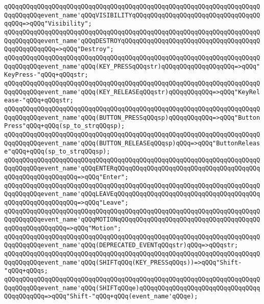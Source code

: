 \verb|qQQqqQQqqQQqqQQqqQQqqQQqqQQqqQQqqQQqqQQqqQQqqQQqqQQqqQQqqQQqqQQqqQQqqQQqqQQqqQQqevent_name'qQQqVISIBILITYqQQqqQQqqQQqqQQqqQQqqQQqqQQqqQQqqQQqqQQq=>qQQq"Visibility";|\newline
\verb|qQQqqQQqqQQqqQQqqQQqqQQqqQQqqQQqqQQqqQQqqQQqqQQqqQQqqQQqqQQqqQQqqQQqqQQqqQQqqQQqevent_name'qQQqDESTROYqQQqqQQqqQQqqQQqqQQqqQQqqQQqqQQqqQQqqQQqqQQqqQQqqQQq=>qQQq"Destroy";|\newline
\verb|qQQqqQQqqQQqqQQqqQQqqQQqqQQqqQQqqQQqqQQqqQQqqQQqqQQqqQQqqQQqqQQqqQQqqQQqqQQqqQQqevent_name'qQQq(KEY_PRESSqQQqstr)qQQqqQQqqQQqqQQqqQQq=>qQQq"KeyPress-"qQQq+qQQqstr;|\newline
\verb|qQQqqQQqqQQqqQQqqQQqqQQqqQQqqQQqqQQqqQQqqQQqqQQqqQQqqQQqqQQqqQQqqQQqqQQqqQQqqQQqevent_name'qQQq(KEY_RELEASEqQQqstr)qQQqqQQqqQQq=>qQQq"KeyRelease-"qQQq+qQQqstr;|\newline
\verb|qQQqqQQqqQQqqQQqqQQqqQQqqQQqqQQqqQQqqQQqqQQqqQQqqQQqqQQqqQQqqQQqqQQqqQQqqQQqqQQqevent_name'qQQq(BUTTON_PRESSqQQqsp)qQQqqQQqqQQq=>qQQq"ButtonPress"qQQq+qQQq(sp_to_strqQQqsp);|\newline
\verb|qQQqqQQqqQQqqQQqqQQqqQQqqQQqqQQqqQQqqQQqqQQqqQQqqQQqqQQqqQQqqQQqqQQqqQQqqQQqqQQqevent_name'qQQq(BUTTON_RELEASEqQQqsp)qQQq=>qQQq"ButtonRelease"qQQq+qQQq(sp_to_strqQQqsp);|\newline
\verb|qQQqqQQqqQQqqQQqqQQqqQQqqQQqqQQqqQQqqQQqqQQqqQQqqQQqqQQqqQQqqQQqqQQqqQQqqQQqqQQqevent_name'qQQqENTERqQQqqQQqqQQqqQQqqQQqqQQqqQQqqQQqqQQqqQQqqQQqqQQqqQQqqQQqqQQq=>qQQq"Enter";|\newline
\verb|qQQqqQQqqQQqqQQqqQQqqQQqqQQqqQQqqQQqqQQqqQQqqQQqqQQqqQQqqQQqqQQqqQQqqQQqqQQqqQQqevent_name'qQQqLEAVEqQQqqQQqqQQqqQQqqQQqqQQqqQQqqQQqqQQqqQQqqQQqqQQqqQQqqQQqqQQq=>qQQq"Leave";|\newline
\verb|qQQqqQQqqQQqqQQqqQQqqQQqqQQqqQQqqQQqqQQqqQQqqQQqqQQqqQQqqQQqqQQqqQQqqQQqqQQqqQQqevent_name'qQQqMOTIONqQQqqQQqqQQqqQQqqQQqqQQqqQQqqQQqqQQqqQQqqQQqqQQqqQQqqQQq=>qQQq"Motion";|\newline
\verb|qQQqqQQqqQQqqQQqqQQqqQQqqQQqqQQqqQQqqQQqqQQqqQQqqQQqqQQqqQQqqQQqqQQqqQQqqQQqqQQqevent_name'qQQq(DEPRECATED_EVENTqQQqstr)qQQq=>qQQqstr;|\newline
\verb|qQQqqQQqqQQqqQQqqQQqqQQqqQQqqQQqqQQqqQQqqQQqqQQqqQQqqQQqqQQqqQQqqQQqqQQqqQQqqQQqevent_name'qQQq(SHIFTqQQq(KEY_PRESSqQQqs))=>qQQq"Shift-"qQQq+qQQqs;|\newline
\verb|qQQqqQQqqQQqqQQqqQQqqQQqqQQqqQQqqQQqqQQqqQQqqQQqqQQqqQQqqQQqqQQqqQQqqQQqqQQqqQQqevent_name'qQQq(SHIFTqQQqe)qQQqqQQqqQQqqQQqqQQqqQQqqQQqqQQqqQQqqQQqqQQq=>qQQq"Shift-"qQQq+qQQq(event_name'qQQqe);|\newline
